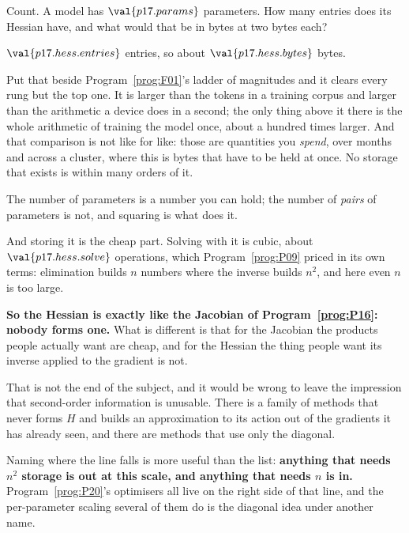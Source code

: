 \begin{fr}
Count. A model has $\val{p17.params}$ parameters. How many entries does its
Hessian have, and what would that be in bytes at two bytes each?
\dotline
\nextframe
\end{fr}

\begin{fr}
\begin{ansblock}
$\val{p17.hess.entries}$ entries, so about $\val{p17.hess.bytes}$ bytes.
\end{ansblock}

Put that beside Program~\ref{prog:F01}'s ladder of magnitudes and it clears
every rung but the top one. It is larger than the tokens in a training corpus
and larger than the arithmetic a device does in a second; the only thing above
it there is the whole arithmetic of training the model once, about a hundred
times larger. And that comparison is not like for like: those are quantities
you \emph{spend}, over months and across a cluster, where this is bytes that
have to be held at once. No storage that exists is within many orders of it.

The number of parameters is a number you can hold; the number of \emph{pairs}
of parameters is not, and squaring is what does it.

And storing it is the cheap part. Solving with it is cubic, about
$\val{p17.hess.solve}$ operations, which Program~\ref{prog:P09} priced in its
own terms: elimination builds $n$ numbers where the inverse builds $n^{2}$,
and here even $n$ is too large.

\textbf{So the Hessian is exactly like the Jacobian of
Program~\ref{prog:P16}: nobody forms one.} What is different is that for the
Jacobian the products people actually want are cheap, and for the Hessian the
thing people want \dash{} its inverse applied to the gradient \dash{} is not.
\end{fr}

\begin{fr}
\begin{note}
That is not the end of the subject, and it would be wrong to leave the
impression that second-order information is unusable. There is a family of
methods that never forms $H$ and builds an approximation to its action out of
the gradients it has already seen, and there are methods that use only the
diagonal.

Naming where the line falls is more useful than the list: \textbf{anything that
needs $n^{2}$ storage is out at this scale, and anything that needs $n$ is
in.} Program~\ref{prog:P20}'s optimisers all live on the right side of that
line, and the per-parameter scaling several of them do is the diagonal idea
under another name.
\end{note}
\end{fr}

